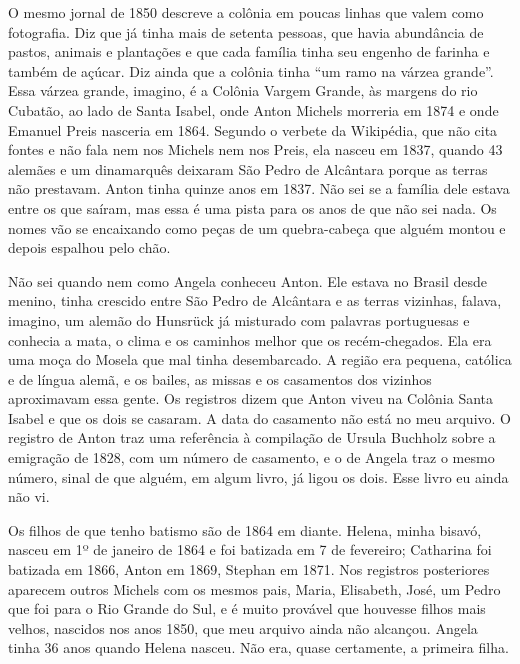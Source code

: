 \documentclass[
  brazilian,
  11pt,
  openany]{book}
\begin{document}
O mesmo jornal de 1850 descreve a colônia em poucas linhas que valem
como fotografia. Diz que já tinha mais de setenta pessoas, que havia
abundância de pastos, animais e plantações e que cada família tinha seu
engenho de farinha e também de açúcar. Diz ainda que a colônia tinha
``um ramo na várzea grande''. Essa várzea grande, imagino, é a Colônia
Vargem Grande, às margens do rio Cubatão, ao lado de Santa Isabel, onde
Anton Michels morreria em 1874 e onde Emanuel Preis nasceria em 1864.
Segundo o verbete da Wikipédia, que não cita fontes e não fala nem nos
Michels nem nos Preis, ela nasceu em 1837, quando 43 alemães e um
dinamarquês deixaram São Pedro de Alcântara porque as terras não
prestavam. Anton tinha quinze anos em 1837. Não sei se a família dele
estava entre os que saíram, mas essa é uma pista para os anos de que não
sei nada. Os nomes vão se encaixando como peças de um quebra-cabeça que
alguém montou e depois espalhou pelo chão.

Não sei quando nem como Angela conheceu Anton. Ele estava no Brasil
desde menino, tinha crescido entre São Pedro de Alcântara e as terras
vizinhas, falava, imagino, um alemão do Hunsrück já misturado com
palavras portuguesas e conhecia a mata, o clima e os caminhos melhor que
os recém-chegados. Ela era uma moça do Mosela que mal tinha
desembarcado. A região era pequena, católica e de língua alemã, e os
bailes, as missas e os casamentos dos vizinhos aproximavam essa gente.
Os registros dizem que Anton viveu na Colônia Santa Isabel e que os dois
se casaram. A data do casamento não está no meu arquivo. O registro de
Anton traz uma referência à compilação de Ursula Buchholz sobre a
emigração de 1828, com um número de casamento, e o de Angela traz o
mesmo número, sinal de que alguém, em algum livro, já ligou os dois.
Esse livro eu ainda não vi.

Os filhos de que tenho batismo são de 1864 em diante. Helena, minha
bisavó, nasceu em 1º de janeiro de 1864 e foi batizada em 7 de
fevereiro; Catharina foi batizada em 1866, Anton em 1869, Stephan em
1871. Nos registros posteriores aparecem outros Michels com os mesmos
pais, Maria, Elisabeth, José, um Pedro que foi para o Rio Grande do Sul,
e é muito provável que houvesse filhos mais velhos, nascidos nos anos
1850, que meu arquivo ainda não alcançou. Angela tinha 36 anos quando
Helena nasceu. Não era, quase certamente, a primeira filha.
\end{document}
